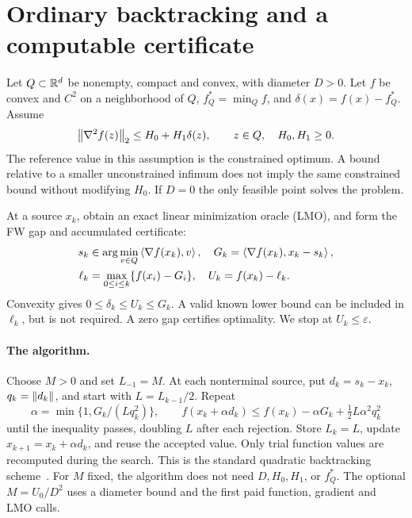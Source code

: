 \section{Ordinary backtracking and a computable certificate}
\label{sec:model}
Let $Q\subset\mathbb R^d$ be nonempty, compact and convex, with diameter
$D>0$. Let $f$ be convex and $C^2$ on a neighborhood of $Q$,
$f_Q^*=\min_Q f$, and $\delta(x)=f(x)-f_Q^*$. Assume
\begin{equation}\label{eq:curvature}
 \left\|\nabla^2f(z)\right\|_2\le H_0+H_1\delta(z),\qquad z\in Q,
 \quad H_0,H_1\ge0.
\end{equation}
The reference value in this assumption is the constrained optimum.
A bound relative to a smaller unconstrained infimum does not imply the
same constrained bound without modifying $H_0$.
If $D=0$ the only feasible point solves the problem.

At a source $x_k$, obtain an exact linear minimization oracle (LMO),
and form the FW gap and accumulated certificate:
\begin{align}
 s_k&\in\arg\min_{v\in Q}\left\langle\nabla f(x_k),v\right\rangle,\quad
 G_k=\left\langle\nabla f(x_k),x_k-s_k\right\rangle,\label{eq:gap}\\
 \ell_k&=\max_{0\le i\le k}\{f(x_i)-G_i\},\quad
 U_k=f(x_k)-\ell_k.\label{eq:certificate}
\end{align}
Convexity gives $0\le\delta_k\le U_k\le G_k$. A valid known lower
bound can be included in $\ell_k$, but is not required. A zero gap
certifies optimality. We stop at $U_k\le\varepsilon$.

\paragraph{The algorithm.}
Choose $M>0$ and set $L_{-1}=M$. At each nonterminal source, put
$d_k=s_k-x_k$, $q_k=\left\|d_k\right\|$, and start with $L=L_{k-1}/2$.
Repeat
\begin{equation}\label{eq:btstep}
 \alpha=\min\{1,G_k/(Lq_k^2)\},\qquad
 f(x_k+\alpha d_k)\le f(x_k)-\alpha G_k
                         +\tfrac12L\alpha^2q_k^2
\end{equation}
until the inequality passes, doubling $L$ after each rejection.
Store $L_k=L$, update $x_{k+1}=x_k+\alpha d_k$, and reuse the accepted
value. Only trial function values are recomputed during the search.
This is the standard quadratic backtracking scheme~\cite{pedregosa}.
For $M$ fixed, the algorithm does not need $D,H_0,H_1$, or $f_Q^*$.
The optional $M=U_0/D^2$ uses a diameter bound and the first paid
function, gradient and LMO calls.

